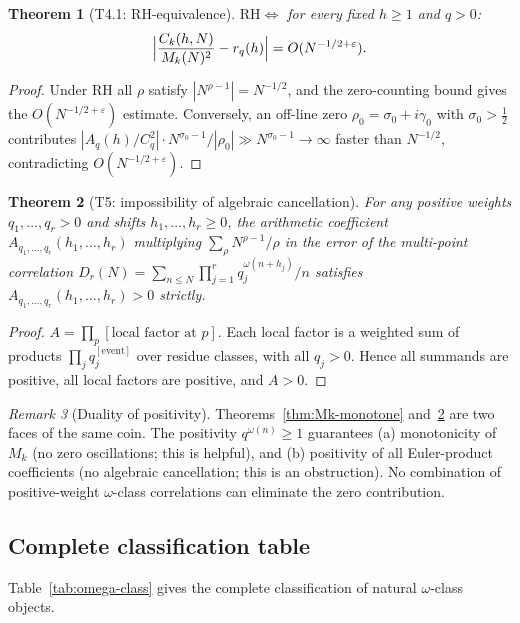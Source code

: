 \documentclass[11pt]{amsart}
\newtheorem{theorem}{Theorem}[section]
\theoremstyle{definition}
\theoremstyle{remark}
\newtheorem{remark}[theorem]{Remark}
\newcommand{\RH}{\mathrm{RH}}
\newcommand{\half}{\tfrac{1}{2}}
\newcommand{\om}{\omega}
\newcommand{\sig}{\sigma}
\newcommand{\gam}{\gamma}
\newcommand{\eps}{\varepsilon}
\begin{document}
\begin{theorem}[T4.1: RH-equivalence]
\label{thm:T4.1}
$\RH \Longleftrightarrow$ for every fixed $h\ge 1$ and $q > 0$:
\[
  \Bigl|\frac{C_k(h,N)}{M_k(N)^2} - r_q(h)\Bigr| = O(N^{-1/2+\eps}).
\]
\end{theorem}

\begin{proof}
Under RH all $\rho$ satisfy $|N^{\rho-1}| = N^{-1/2}$, and the zero-counting bound
gives the $O(N^{-1/2+\eps})$ estimate.  Conversely, an off-line zero $\rho_0 =
\sig_0+i\gam_0$ with $\sig_0>\half$ contributes $|A_q(h)/C_q^2| \cdot N^{\sig_0-1} /
|\rho_0| \gg N^{\sig_0-1} \to \infty$ faster than $N^{-1/2}$, contradicting
$O(N^{-1/2+\eps})$.
\end{proof}

\begin{theorem}[T5: impossibility of algebraic cancellation]
\label{thm:T5}
For any positive weights $q_1,\ldots,q_r>0$ and shifts $h_1,\ldots,h_r\ge 0$, the
arithmetic coefficient $A_{q_1,\ldots,q_r}(h_1,\ldots,h_r)$ multiplying
$\sum_\rho N^{\rho-1}/\rho$ in the error of the multi-point correlation
$D_r(N) = \sum_{n\le N}\prod_{j=1}^r q_j^{\om(n+h_j)}/n$ satisfies
$A_{q_1,\ldots,q_r}(h_1,\ldots,h_r) > 0$ strictly.
\end{theorem}

\begin{proof}
$A = \prod_p[\text{local factor at }p]$.  Each local factor is a weighted sum of
products $\prod_j q_j^{[\text{event}]}$ over residue classes, with all $q_j>0$.
Hence all summands are positive, all local factors are positive, and $A>0$.
\end{proof}

\begin{remark}[Duality of positivity]
Theorems~\ref{thm:Mk-monotone} and~\ref{thm:T5} are two faces of the same coin.
The positivity $q^{\om(n)}\ge 1$ guarantees (a) monotonicity of $M_k$ (no zero
oscillations; this is helpful), and (b) positivity of all Euler-product coefficients
(no algebraic cancellation; this is an obstruction).  No combination of positive-weight
$\om$-class correlations can eliminate the zero contribution.
\end{remark}

\subsection{Complete classification table}

Table~\ref{tab:omega-class} gives the complete classification of natural $\om$-class objects.
\end{document}
